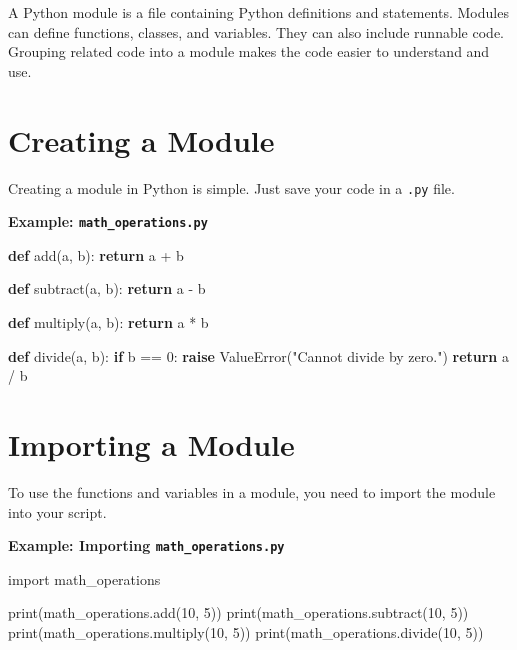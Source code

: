 \documentclass[
  letterpaper,
  DIV=11,
  numbers=noendperiod]{scrreprt}
\newenvironment{Shaded}{\begin{snugshade}}{\end{snugshade}}
\newcommand{\BuiltInTok}[1]{\textcolor[rgb]{0.00,0.23,0.31}{#1}}
\newcommand{\ControlFlowTok}[1]{\textcolor[rgb]{0.00,0.23,0.31}{\textbf{#1}}}
\newcommand{\DecValTok}[1]{\textcolor[rgb]{0.68,0.00,0.00}{#1}}
\newcommand{\ImportTok}[1]{\textcolor[rgb]{0.00,0.46,0.62}{#1}}
\newcommand{\KeywordTok}[1]{\textcolor[rgb]{0.00,0.23,0.31}{\textbf{#1}}}
\newcommand{\NormalTok}[1]{\textcolor[rgb]{0.00,0.23,0.31}{#1}}
\newcommand{\OperatorTok}[1]{\textcolor[rgb]{0.37,0.37,0.37}{#1}}
\newcommand{\PreprocessorTok}[1]{\textcolor[rgb]{0.68,0.00,0.00}{#1}}
\newcommand{\StringTok}[1]{\textcolor[rgb]{0.13,0.47,0.30}{#1}}
\begin{document}
A Python module is a file containing Python definitions and statements.
Modules can define functions, classes, and variables. They can also
include runnable code. Grouping related code into a module makes the
code easier to understand and use.

\section{Creating a Module}\label{creating-a-module}

Creating a module in Python is simple. Just save your code in a
\texttt{.py} file.

\textbf{Example: \texttt{math\_operations.py}}

\begin{Shaded}
\begin{Highlighting}[]
\KeywordTok{def}\NormalTok{ add(a, b):}
    \ControlFlowTok{return}\NormalTok{ a }\OperatorTok{+}\NormalTok{ b}

\KeywordTok{def}\NormalTok{ subtract(a, b):}
    \ControlFlowTok{return}\NormalTok{ a }\OperatorTok{{-}}\NormalTok{ b}

\KeywordTok{def}\NormalTok{ multiply(a, b):}
    \ControlFlowTok{return}\NormalTok{ a }\OperatorTok{*}\NormalTok{ b}

\KeywordTok{def}\NormalTok{ divide(a, b):}
    \ControlFlowTok{if}\NormalTok{ b }\OperatorTok{==} \DecValTok{0}\NormalTok{:}
        \ControlFlowTok{raise} \PreprocessorTok{ValueError}\NormalTok{(}\StringTok{"Cannot divide by zero."}\NormalTok{)}
    \ControlFlowTok{return}\NormalTok{ a }\OperatorTok{/}\NormalTok{ b}
\end{Highlighting}
\end{Shaded}

\section{Importing a Module}\label{importing-a-module}

To use the functions and variables in a module, you need to import the
module into your script.

\textbf{Example: Importing \texttt{math\_operations.py}}

\begin{Shaded}
\begin{Highlighting}[]
\ImportTok{import}\NormalTok{ math\_operations}

\BuiltInTok{print}\NormalTok{(math\_operations.add(}\DecValTok{10}\NormalTok{, }\DecValTok{5}\NormalTok{))}
\BuiltInTok{print}\NormalTok{(math\_operations.subtract(}\DecValTok{10}\NormalTok{, }\DecValTok{5}\NormalTok{))}
\BuiltInTok{print}\NormalTok{(math\_operations.multiply(}\DecValTok{10}\NormalTok{, }\DecValTok{5}\NormalTok{))}
\BuiltInTok{print}\NormalTok{(math\_operations.divide(}\DecValTok{10}\NormalTok{, }\DecValTok{5}\NormalTok{))}
\end{Highlighting}
\end{Shaded}
\end{document}
